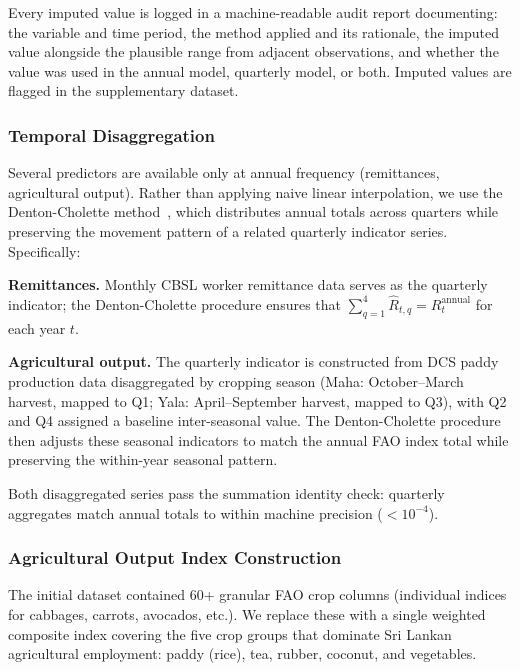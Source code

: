 \documentclass[sigconf]{acmart}
\begin{document}
Every imputed value is logged in a machine-readable audit report
documenting: the variable and time period, the method applied and
its rationale, the imputed value alongside the plausible range
from adjacent observations, and whether the value was used in the
annual model, quarterly model, or both. Imputed values are flagged
in the supplementary dataset.

\subsubsection{Temporal Disaggregation}

Several predictors are available only at annual frequency
(remittances, agricultural output). Rather than applying naive
linear interpolation, we use the Denton-Cholette
method~\cite{denton1971}, which distributes annual totals across
quarters while preserving the movement pattern of a related
quarterly indicator series. Specifically:

\textbf{Remittances.} Monthly CBSL worker remittance data serves as
the quarterly indicator; the Denton-Cholette procedure ensures that
$\sum_{q=1}^{4} \hat{R}_{t,q} = R_t^{\text{annual}}$ for each year
$t$.

\textbf{Agricultural output.} The quarterly indicator is constructed
from DCS paddy production data disaggregated by cropping season
(Maha: October--March harvest, mapped to Q1; Yala: April--September
harvest, mapped to Q3), with Q2 and Q4 assigned a baseline
inter-seasonal value. The Denton-Cholette procedure then adjusts
these seasonal indicators to match the annual FAO index total while
preserving the within-year seasonal pattern.

Both disaggregated series pass the summation identity check:
quarterly aggregates match annual totals to within machine precision
($< 10^{-4}$).

\subsubsection{Agricultural Output Index Construction}

The initial dataset contained 60+ granular FAO crop columns
(individual indices for cabbages, carrots, avocados, etc.). We
replace these with a single weighted composite index covering
the five crop groups that dominate Sri Lankan agricultural
employment: paddy (rice), tea, rubber, coconut, and vegetables.
\end{document}
